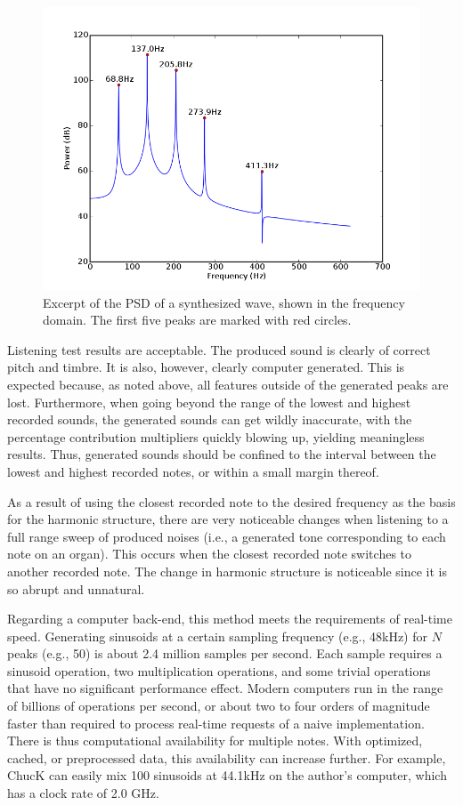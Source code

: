 \documentclass[twocolumn]{article}
\begin{document}
\begin{figure}
\centering
\includegraphics[width=\linewidth]{figures/synth-peaks.png}
\caption{Excerpt of the PSD of a synthesized wave, shown in the frequency domain. The first five peaks are marked with red circles.}
\label{synth-peaks}
\end{figure}

Listening test results are acceptable. The produced sound is clearly of correct pitch and timbre. It is also, however, clearly computer generated. This is expected because, as noted above, all features outside of the generated peaks are lost. Furthermore, when going beyond the range of the lowest and highest recorded sounds, the generated sounds can get wildly inaccurate, with the percentage contribution multipliers quickly blowing up, yielding meaningless results. Thus, generated sounds should be confined to the interval between the lowest and highest recorded notes, or within a small margin thereof.

As a result of using the closest recorded note to the desired frequency as the basis for the harmonic structure, there are very noticeable changes when listening to a full range sweep of produced noises (i.e., a generated tone corresponding to each note on an organ). This occurs when the closest recorded note switches to another recorded note. The change in harmonic structure is noticeable since it is so abrupt and unnatural.

Regarding a computer back-end, this method meets the requirements of real-time speed. Generating sinusoids at a certain sampling frequency (e.g., 48kHz) for $N$ peaks (e.g., 50) is about 2.4 million samples per second. Each sample requires a sinusoid operation, two multiplication operations, and some trivial operations that have no significant performance effect. Modern computers run in the range of billions of operations per second, or about two to four orders of magnitude faster than required to process real-time requests of a naive implementation. There is thus computational availability for multiple notes. With optimized, cached, or preprocessed data, this availability can increase further. For example, ChucK can easily mix 100 sinusoids at 44.1kHz on the author's computer, which has a clock rate of 2.0 GHz.
\end{document}
